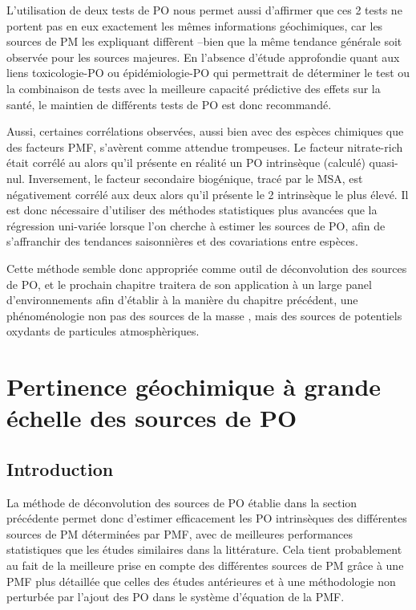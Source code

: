 L'utilisation de deux tests de PO nous permet aussi d'affirmer que ces 2 tests ne portent
pas en eux exactement les mêmes informations géochimiques, car les sources de PM les
expliquant diffèrent --bien que la même tendance générale soit observée pour les sources
majeures. En l'absence d'étude approfondie quant aux liens toxicologie-PO ou
épidémiologie-PO qui permettrait de déterminer le test ou la combinaison de tests avec la
meilleure capacité prédictive des effets sur la santé, le maintien de
différents tests de PO est donc recommandé.

Aussi, certaines corrélations observées, aussi bien avec des espèces chimiques que des
facteurs PMF, s'avèrent comme attendue trompeuses. Le facteur nitrate-rich était corrélé au
\POAAv{} alors qu'il présente en réalité un PO intrinsèque (calculé) quasi-nul. Inversement, le facteur
secondaire biogénique, tracé par le MSA, est négativement corrélé aux deux \OPv{} alors
qu'il présente le 2\ieme{} \PODTT{} intrinsèque le plus élevé. Il est donc nécessaire
d'utiliser des méthodes statistiques plus avancées que la régression uni-variée lorsque
l'on cherche à estimer les sources de PO, afin de s'affranchir des tendances saisonnières et
des covariations entre espèces.

Cette méthode semble donc appropriée comme outil de déconvolution des sources de PO, et le
prochain chapitre traitera de son application à un large panel d'environnements afin
d'établir à la manière du chapitre précédent, une phénoménologie non pas des sources de la
masse \PMdix, mais des sources de potentiels oxydants de particules atmosphèriques.


\section{Pertinence géochimique à grande échelle des sources de PO}%
\label{sec:synthèse_grande_échelle}

\subsection{Introduction}%
\label{sub:introduction_synthèse_nationale}

La méthode de déconvolution des sources de PO établie dans la section précédente permet
donc d'estimer efficacement les PO intrinsèques des différentes sources de PM déterminées
par PMF, avec de meilleures performances statistiques que les études similaires dans la
littérature.  Cela tient probablement au fait de la meilleure prise en compte des
différentes sources de PM grâce à une PMF plus détaillée que celles des études antérieures
et à une méthodologie non perturbée par l'ajout des PO dans le système d'équation de la PMF.

